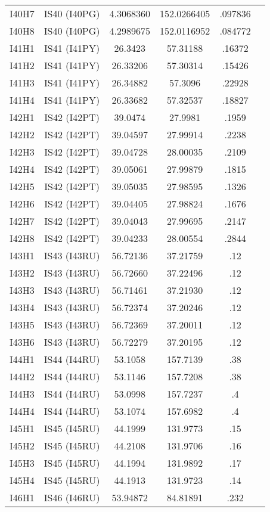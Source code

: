 \documentclass[a4paper, 10pt]{report}
\begin{document}
{\begin{center}
\begin{tabular}{|c|c|c|c|c|c|}
I40H7&	IS40 (I40PG)&	 	4.3068360&	152.0266405&	.097836\\
I40H8&	IS40 (I40PG)&	 	4.2989675&	152.0116952&	.084772\\
I41H1&	IS41 (I41PY)&	 	26.3423&	57.31188&	.16372\\
I41H2&	IS41 (I41PY)&	 	26.33206&	57.30314&	.15426\\
I41H3&	IS41 (I41PY)&	 	26.34882&	57.3096&	.22928\\
I41H4&	IS41 (I41PY)&	 	26.33682&	57.32537&	.18827\\
I42H1&	IS42 (I42PT)&	 	39.0474&	27.9981&	.1959\\
I42H2&	IS42 (I42PT)&	 	39.04597&	27.99914&	.2238\\
I42H3&	IS42 (I42PT)&	 	39.04728&	28.00035&	.2109\\
I42H4&	IS42 (I42PT)&	 	39.05061&	27.99879&	.1815\\
I42H5&	IS42 (I42PT)&	 	39.05035&	27.98595&	.1326\\
I42H6&	IS42 (I42PT)&	 	39.04405&	27.98824&	.1676\\
I42H7&	IS42 (I42PT)&	 	39.04043&	27.99695&	.2147\\
I42H8&	IS42 (I42PT)&	 	39.04233&	28.00554&	.2844\\
I43H1&	IS43 (I43RU)&	 	56.72136&	37.21759&	.12\\
I43H2&	IS43 (I43RU)&	 	56.72660&	37.22496&	.12\\
I43H3&	IS43 (I43RU)&	 	56.71461&	37.21930&	.12\\
I43H4&	IS43 (I43RU)&	 	56.72374&	37.20246&	.12\\
I43H5&	IS43 (I43RU)&	 	56.72369&	37.20011&	.12\\
I43H6&	IS43 (I43RU)&	 	56.72279&	37.20195&	.12\\
I44H1&	IS44 (I44RU)&	 	53.1058&	157.7139&	.38\\
I44H2&	IS44 (I44RU)&	 	53.1146&	157.7208&	.38\\
I44H3&	IS44 (I44RU)&	 	53.0998&	157.7237&	.4\\
I44H4&	IS44 (I44RU)&	 	53.1074&	157.6982&	.4\\
I45H1&	IS45 (I45RU)&	 	44.1999&	131.9773&	.15\\
I45H2&	IS45 (I45RU)&	 	44.2108&	131.9706&	.16\\
I45H3&	IS45 (I45RU)&	 	44.1994&	131.9892&	.17\\
I45H4&	IS45 (I45RU)&	 	44.1913&	131.9723&	.14\\
I46H1&	IS46 (I46RU)&	 	53.94872&	84.81891&	.232\\

\end{tabular}
\end{center}}
\end{document}
